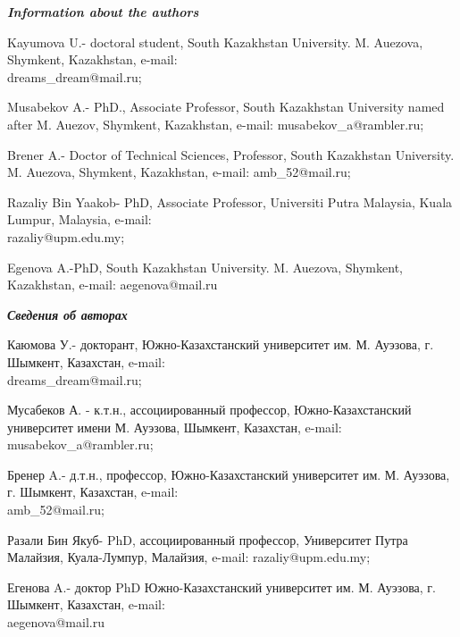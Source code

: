 \begin{authorinfo}
\hspace{1em}\emph{{\bfseries Information about the authors}}

Kayumova U.- doctoral student, South Kazakhstan University. M. Auezova,
Shymkent, Kazakhstan, e-mail: \\dreams\_dream@mail.ru;

Musabekov A.- PhD., Associate Professor, South Kazakhstan University
named after M. Auezov, Shymkent, Kazakhstan,
e-mail: musabekov\_a@rambler.ru;

Brener A.- Doctor of Technical Sciences, Professor, South Kazakhstan
University. M. Auezova, Shymkent, Kazakhstan, e-mail: amb\_52@mail.ru;

Razaliy Bin Yaakob- PhD, Associate Professor, Universiti Putra Malaysia,
Kuala Lumpur, Malaysia, e-mail: \\razaliy@upm.edu.my;

Egenova A.-PhD, South Kazakhstan University. M. Auezova, Shymkent,
Kazakhstan, e-mail: aegenova@mail.ru

\hspace{1em}\emph{{\bfseries Сведения об авторах}}

Каюмова У.- докторант, Южно-Казахстанский университет им. М. Ауэзова, г.
Шымкент, Казахстан, e-mail: \\dreams\_dream@mail.ru;

Мусабеков А. - к.т.н., ассоциированный профессор, Южно-Казахстанский
университет имени М. Ауэзова, Шымкент, Казахстан, e-mail: musabekov\_a@rambler.ru;

Бренер A.- д.т.н., профессор, Южно-Казахстанский университет им. М.
Ауэзова, г. Шымкент, Казахстан, e-mail: \\amb\_52@mail.ru;

Разали Бин Якуб- PhD, ассоциированный профессор, Университет Путра
Малайзия, Куала-Лумпур, Малайзия, e-mail: razaliy@upm.edu.my;

Егенова A.- доктор PhD Южно-Казахстанский университет им. М. Ауэзова, г.
Шымкент, Казахстан, e-mail: \\aegenova@mail.ru
\end{authorinfo}
